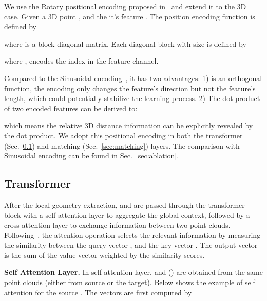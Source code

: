 We use the Rotary positional encoding proposed in~\cite{su2021roformer} and extend it to the 3D case.
Given a 3D point , 
and the it's feature .
The position encoding function  is defined by

\begin{center}

\scalebox{0.65}{

}    

\end{center}
where  is a block diagonal matrix. Each diagonal block with size  is defined by 
\begin{center}
\scalebox{0.7}{

}    
\end{center}
where , 
\scalebox{0.7}{} encodes the index in the feature channel.

Compared to the Sinusoidal encoding~\cite{attention_is_all_u_need,carion2020deter}, it has two advantages: 1)  is an orthogonal function, the encoding only changes the feature's direction but not the feature's length, which could potentially stabilize the learning process. 2) The dot product of two encoded features  can be derived to:

which means the relative 3D distance information can be explicitly revealed by the dot product.
We adopt this positional encoding in both the transformer (Sec.~\ref{sec:transformer}) and matching (Sec.~\ref{sec:matching}) layers.
The comparison with Sinusoidal encoding can be found in Sec.~\ref{sec:ablation}.





\subsection{Transformer}\label{sec:transformer}

After the local geometry extraction,  and  are passed through the transformer block with a self attention layer to aggregate the global context, followed by a cross attention layer to exchange information between two point clouds.  Following~\cite{attention_is_all_u_need}, the attention operation selects the relevant information by measuring the similarity between the query vector , and the key vector . 
The output vector is the sum of the value vector  weighted by the similarity scores. 

\medskip
\noindent
\textbf{Self Attention Layer.}
In self attention layer,  and () are obtained from the same point clouds (either from source or the target).  Below shows the example of self attention for the source .
The vectors  are first computed by

